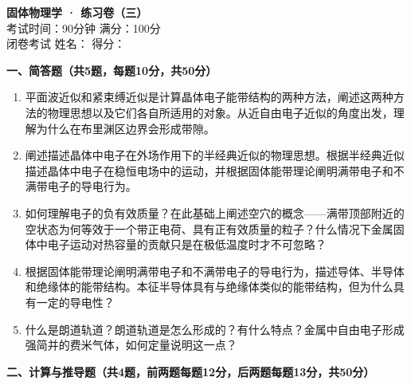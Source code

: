 \documentclass[12pt,a4paper,fontset=mac]{ctexart}
\newcommand{\shortanswer}{\vspace{5cm}}
\begin{document}
\newpage

\begin{center}
{\LARGE \textbf{固体物理学 · 练习卷（三）}}\\[0.5em]
{\large 考试时间：90分钟 \quad 满分：100分}\\[0.3em]
{\normalsize 闭卷考试 \quad 姓名：\underline{\hspace{3cm}} \quad 得分：\underline{\hspace{2cm}}}
\end{center}

\vspace{0.5em}

\noindent\textbf{一、简答题（共5题，每题10分，共50分）}

\begin{enumerate}
\item 平面波近似和紧束缚近似是计算晶体电子能带结构的两种方法，阐述这两种方法的物理思想以及它们各自所适用的对象。从近自由电子近似的角度出发，理解为什么在布里渊区边界会形成带隙。
\shortanswer

\item 阐述描述晶体中电子在外场作用下的半经典近似的物理思想。根据半经典近似描述晶体中电子在稳恒电场中的运动，并根据固体能带理论阐明满带电子和不满带电子的导电行为。
\shortanswer

\item 如何理解电子的负有效质量？在此基础上阐述空穴的概念——满带顶部附近的空状态为何等效于一个带正电荷、具有正有效质量的粒子？什么情况下金属固体中电子运动对热容量的贡献只是在极低温度时才不可忽略？
\shortanswer

\item 根据固体能带理论阐明满带电子和不满带电子的导电行为，描述导体、半导体和绝缘体的能带结构。本征半导体具有与绝缘体类似的能带结构，但为什么具有一定的导电性？
\shortanswer

\item 什么是朗道轨道？朗道轨道是怎么形成的？有什么特点？金属中自由电子形成强简并的费米气体，如何定量说明这一点？
\shortanswer

\end{enumerate}

\newpage

\noindent\textbf{二、计算与推导题（共4题，前两题每题12分，后两题每题13分，共50分）}
\end{document}
